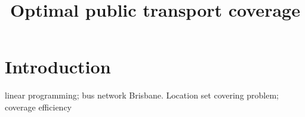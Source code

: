 \documentclass{article}
\title{Optimal public transport coverage}
\author{}
\date{}
\begin{document}
\maketitle

\section{Introduction}





\cite{murray2001strategic} linear programming; bus network Brisbane. Location set covering problem; coverage efficiency







\end{document}
